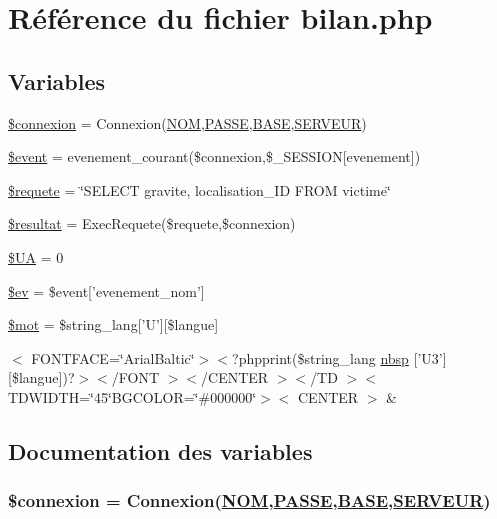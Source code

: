 \hypertarget{bilan_8php}{
\section{R\'{e}f\'{e}rence du fichier bilan.php}
\label{bilan_8php}
}
\subsection*{Variables}
\begin{CompactItemize}
\item 
\hyperlink{bilan_8php_a0}{\$connexion} = Connexion(\hyperlink{pma__connect_8php_a0}{NOM},\hyperlink{pma__connect_8php_a1}{PASSE},\hyperlink{pma__connect_8php_a3}{BASE},\hyperlink{pma__connect_8php_a2}{SERVEUR})
\item 
\hyperlink{bilan_8php_a1}{\$event} = evenement\_\-courant(\$connexion,\$\_\-SESSION\mbox{[}evenement\mbox{]})
\item 
\hyperlink{bilan_8php_a2}{\$requete} = \char`\"{}SELECT gravite, localisation\_\-ID FROM victime\char`\"{}
\item 
\hyperlink{bilan_8php_a3}{\$resultat} = Exec\-Requete(\$requete,\$connexion)
\item 
\hyperlink{bilan_8php_a4}{\$UA} = 0
\item 
\hyperlink{bilan_8php_a5}{\$ev} = \$event\mbox{[}'evenement\_\-nom'\mbox{]}
\item 
\hyperlink{bilan_8php_a6}{\$mot} = \$string\_\-lang\mbox{[}'U'\mbox{]}\mbox{[}\$langue\mbox{]}
\item 
$<$ FONTFACE=\char`\"{}Arial\-Baltic\char`\"{}$>$$<$?phpprint(\$string\_\-lang \hyperlink{bilan_8php_a7}{nbsp} \mbox{[}'U3'\mbox{]}\mbox{[}\$langue\mbox{]})?$>$$<$/FONT $>$$<$/CENTER $>$$<$/TD $>$$<$ TDWIDTH=\char`\"{}45\char`\"{}BGCOLOR=\char`\"{}\#000000\char`\"{}$>$$<$ CENTER $>$ \&
\end{CompactItemize}


\subsection{Documentation des variables}
\hypertarget{bilan_8php_a0}{
\subsubsection[\$connexion]{\setlength{\rightskip}{0pt plus 5cm}\$connexion = Connexion(\hyperlink{pma__connect_8php_a0}{NOM},\hyperlink{pma__connect_8php_a1}{PASSE},\hyperlink{pma__connect_8php_a3}{BASE},\hyperlink{pma__connect_8php_a2}{SERVEUR})}}
\label{bilan_8php_a0}


